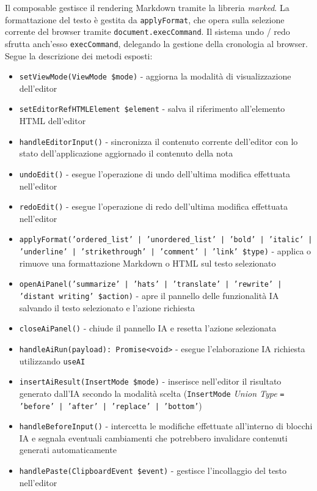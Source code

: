 \documentclass[a4paper,10pt]{article}
\begin{document}
Il composable gestisce il rendering Markdown tramite la libreria \textit{marked}. La formattazione del testo è gestita da \texttt{applyFormat}, che opera sulla selezione corrente del browser tramite \texttt{document.execCommand}. Il sistema undo / redo sfrutta anch'esso \texttt{execCommand}, delegando la gestione della cronologia al browser. Segue la descrizione dei metodi esposti:
\begin{itemize}
    \item \texttt{setViewMode(ViewMode \$mode)} - aggiorna la modalità di visualizzazione dell'editor
    \item \texttt{setEditorRef{HTMLElement \$element}} - salva il riferimento all'elemento HTML dell'editor
    \item \texttt{handleEditorInput()} - sincronizza il contenuto corrente dell'editor con lo stato dell'applicazione aggiornado il contenuto della nota
    \item \texttt{undoEdit()} - esegue l'operazione di undo dell'ultima modifica effettuata nell'editor
    \item \texttt{redoEdit()} - esegue l'operazione di redo dell'ultima modifica effettuata nell'editor
    \item \texttt{applyFormat('ordered\_list' | 'unordered\_list' | 'bold' | 'italic' | 'underline' | 'strikethrough' | 'comment' | 'link' \$type)} - applica o rimuove una formattazione Markdown o HTML sul testo selezionato
    \item \texttt{openAiPanel('summarize' | 'hats' | 'translate' | 'rewrite' | 'distant writing' \$action)} - apre il pannello delle funzionalità IA salvando il testo selezionato e l'azione richiesta
    \item \texttt{closeAiPanel()} - chiude il pannello IA e resetta l'azione selezionata
    \item \texttt{handleAiRun(payload): Promise<void>} - esegue l'elaborazione IA richiesta utilizzando \texttt{useAI}
    \item \texttt{insertAiResult(InsertMode \$mode)} - inserisce nell'editor il risultato generato dall'IA secondo la modalità scelta (\texttt{InsertMode} \textit{Union Type} \texttt{= 'before' | 'after' | 'replace' | 'bottom'})
    \item \texttt{handleBeforeInput()} - intercetta le modifiche effettuate all'interno di blocchi IA e segnala eventuali cambiamenti che potrebbero invalidare contenuti generati automaticamente
    \item \texttt{handlePaste(ClipboardEvent \$event)} - gestisce l'incollaggio del testo nell'editor

\end{itemize}
\end{document}
